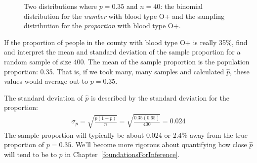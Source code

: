 \begin{figure}[ht]
\centering
{}
\caption{Two distributions where $p=0.35$ and $n=40$:  the binomial distribution for the \emph{number} with blood type O+ and the sampling distribution for the \emph{proportion} with blood type O+. }
\label{oPositive40prop}
\end{figure}



\begin{examplewrap}
\begin{nexample}{If the proportion of people in the county with blood type O+ is really 35\%, find and interpret the mean and standard deviation of the sample proportion for a random sample of size 400.}
The mean of the sample proportion is the population proportion: 0.35. That is, if we took many, many samples and calculated $\hat{p}$, these values would average out to $p = 0.35$.

The standard deviation of $\hat{p}$ is described by the standard deviation for the proportion:
\begin{align*}
\sigma_{\hat{p}}
	= \sqrt{\frac{p(1-p)}{n}}
	= \sqrt{\frac{0.35(0.65)}{400}}
	= 0.024
\end{align*}
The sample proportion will typically be about 0.024 or 2.4\% away from the true proportion of $p = 0.35$. We'll become more rigorous about quantifying how close $\hat{p}$ will tend to be to $p$ in Chapter~\ref{foundationsForInference}.
\end{nexample}
\end{examplewrap}

